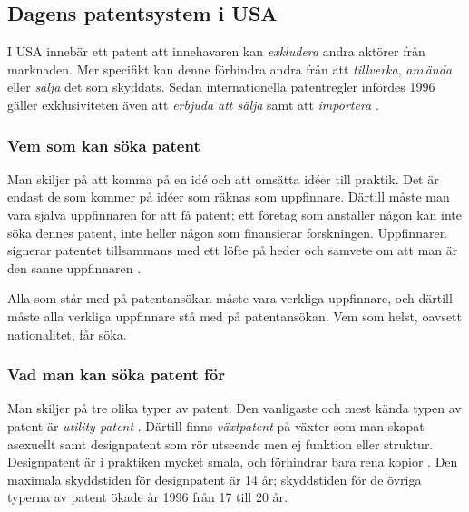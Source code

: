 \subsection{Dagens patentsystem i USA}

I USA innebär ett patent att innehavaren kan \emph{exkludera} andra aktörer från marknaden. Mer specifikt kan denne förhindra andra från att \emph{tillverka}, \emph{använda} eller \emph{sälja} det som skyddats. Sedan internationella patentregler infördes 1996 gäller exklusiviteten även att \emph{erbjuda att sälja} samt att \emph{importera} \cite{cmu-overview}.

\subsubsection{Vem som kan söka patent}
Man skiljer på att komma på en idé och att omsätta idéer till praktik. Det är endast de som kommer på idéer som räknas som uppfinnare. Därtill måste man vara själva uppfinnaren för att få patent; ett företag som anställer någon kan inte söka dennes patent, inte heller någon som finansierar forskningen. Uppfinnaren signerar patentet tillsammans med ett löfte på heder och samvete om att man är den sanne uppfinnaren \cite{cmu-overview}.

Alla som står med på patentansökan måste vara verkliga uppfinnare, och därtill måste alla verkliga uppfinnare stå med på patentansökan. Vem som helst, oavsett nationalitet, får söka.

\subsubsection{Vad man kan söka patent för}
Man skiljer på tre olika typer av patent. Den vanligaste och mest kända typen av patent är \emph{utility patent} \cite{cmu-overview}.
Därtill finns \emph{växtpatent} på växter som man skapat asexuellt samt designpatent som rör utseende men ej funktion eller struktur. Designpatent är i praktiken mycket smala, och förhindrar bara rena kopior . Den maximala skyddstiden för designpatent är 14 år; skyddstiden för de övriga typerna av patent ökade år 1996 från 17 till 20 år.

